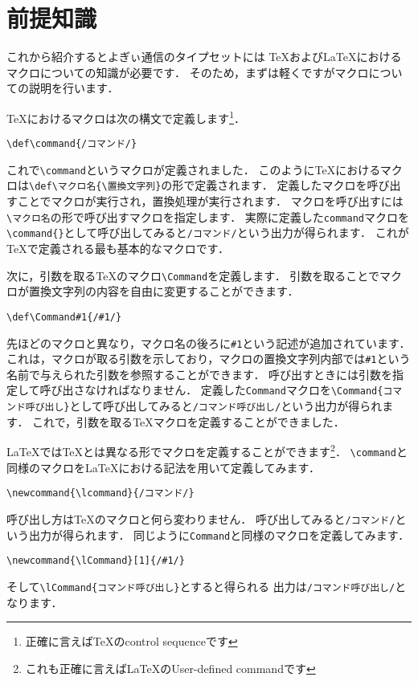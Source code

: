 \section{前提知識}
\newcommand{\lcommand}{/コマンド/}
\newcommand{\lCommand}[1]{/#1/}
{
\def\command{/コマンド/}
\def\Command#1{/#1/}

これから紹介するとよぎぃ通信のタイプセットには
{\TeX}および{\LaTeX}におけるマクロについての知識が必要です．
そのため，まずは軽くですがマクロについての説明を行います．

{\TeX}におけるマクロは次の構文で定義します\footnote{正確に言えば{\TeX}のcontrol sequenceです}．
\begin{verbatim}
\def\command{/コマンド/}
\end{verbatim}

これで\verb|\command|というマクロが定義されました．
このように{\TeX}におけるマクロは\verb|\def\マクロ名{\置換文字列}|の形で定義されます．
定義したマクロを呼び出すことでマクロが実行され，置換処理が実行されます．
マクロを呼び出すには\verb|\マクロ名|の形で呼び出すマクロを指定します．
実際に定義した\verb|command|マクロを\verb|\command{}|として呼び出してみると\texttt{\command{}}という出力が得られます．
これが{\TeX}で定義される最も基本的なマクロです．

次に，引数を取る{\TeX}のマクロ\verb|\Command|を定義します．
引数を取ることでマクロが置換文字列の内容を自由に変更することができます．
\begin{verbatim}
\def\Command#1{/#1/}
\end{verbatim}
先ほどのマクロと異なり，マクロ名の後ろに\verb|#1|という記述が追加されています．
これは，マクロが取る引数を示しており，マクロの置換文字列内部では\verb|#1|という名前で与えられた引数を参照することができます．
呼び出すときには引数を指定して呼び出さなければなりません．
定義した\texttt{Command}マクロを\verb|\Command{コマンド呼び出し}|として呼び出してみると\texttt{\Command{コマンド呼び出し}}という出力が得られます．
これで，引数を取る{\TeX}マクロを定義することができました．

{\LaTeX}では{\TeX}とは異なる形でマクロを定義することができます\footnote{これも正確に言えば{\LaTeX}のUser-defined commandです}．
\verb|\command|と同様のマクロを{\LaTeX}における記法を用いて定義してみます．
\begin{verbatim}
\newcommand{\lcommand}{/コマンド/}
\end{verbatim}
}
呼び出し方は{\TeX}のマクロと何ら変わりません．
呼び出してみると\texttt{\lcommand{}}という出力が得られます．
同じように\verb|Command|と同様のマクロを定義してみます．
\begin{verbatim}
\newcommand{\lCommand}[1]{/#1/}
\end{verbatim}
そして\verb|\lCommand{コマンド呼び出し}|とすると得られる
出力は\texttt{\lCommand{コマンド呼び出し}}となります．

